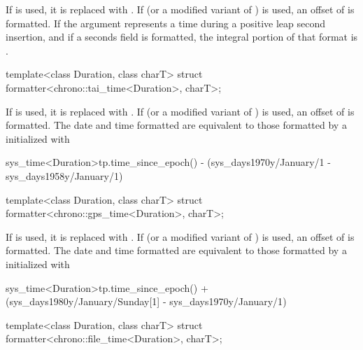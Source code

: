 \begin{itemdescr}
\pnum
\remarks
If  is used,
it is replaced with .
If  (or a modified variant of ) is used,
an offset of  is formatted.
If the argument represents a time during a positive leap second insertion,
and if a seconds field is formatted,
the integral portion of that format is
.
\end{itemdescr}

%
\begin{itemdecl}
template<class Duration, class charT>
  struct formatter<chrono::tai_time<Duration>, charT>;
\end{itemdecl}

\begin{itemdescr}
\pnum
\remarks
If  is used,
it is replaced with .
If  (or a modified variant of ) is used,
an offset of  is formatted.
The date and time formatted are equivalent to
those formatted by a  initialized with
\begin{codeblock}
sys_time<Duration>{tp.time_since_epoch()} -
  (sys_days{1970y/January/1} - sys_days{1958y/January/1})
\end{codeblock}
\end{itemdescr}

%
\begin{itemdecl}
template<class Duration, class charT>
  struct formatter<chrono::gps_time<Duration>, charT>;
\end{itemdecl}

\begin{itemdescr}
\pnum
\remarks
If  is used,
it is replaced with .
If  (or a modified variant of ) is used,
an offset of  is formatted.
The date and time formatted are equivalent to
those formatted by a  initialized with
\begin{codeblock}
sys_time<Duration>{tp.time_since_epoch()} +
  (sys_days{1980y/January/Sunday[1]} - sys_days{1970y/January/1})
\end{codeblock}
\end{itemdescr}

%
\begin{itemdecl}
template<class Duration, class charT>
  struct formatter<chrono::file_time<Duration>, charT>;
\end{itemdecl}


